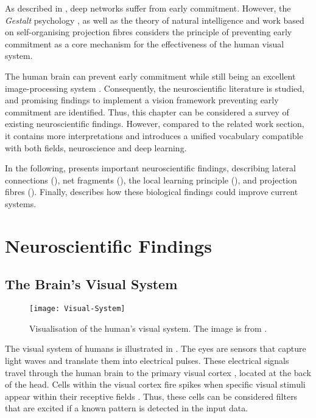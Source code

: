 As described in , deep networks suffer from early commitment.
However, the \emph{Gestalt} psychology \cite{ellis_source_1938, kohler_gestalt_1992, wagemans_century_2012, hamlyn_psychology_2017}, as well as the theory of natural intelligence \cite{von_der_malsburg_theory_2022} and work based on self-organising projection fibres \cite{bienenstock_neural_1987, lades_distortion_1993, wiskott_face_1996, fernandes_self-organization_2015} considers the principle of preventing early commitment as a core mechanism for the effectiveness of the human visual system.

The human brain can prevent early commitment \cite{marr_vision_2010} while still being an excellent image-processing system \cite{ellis_source_1938, kohler_gestalt_1992, wagemans_century_2012, hamlyn_psychology_2017}. 
Consequently, the neuroscientific literature is studied, and promising findings to implement a vision framework preventing early commitment are identified.
Thus, this chapter can be considered a survey of existing neuroscientific findings.
However, compared to the related work section, it contains more interpretations and introduces a unified vocabulary compatible with both fields, neuroscience and deep learning.

In the following,  presents important neuroscientific findings, describing lateral connections (), net fragments (), the local learning principle (), and projection fibres ().
Finally,  describes how these biological findings could improve current systems.



\section{Neuroscientific Findings}

\subsection{The Brain's Visual System}
\begin{figure}[h]
    \centering
    \texttt{[image: Visual-System]}
    \caption[Visualisation of the human's visual system]{Visualisation of the human's visual system. The image is from .}
\end{figure}
%
The visual system of humans is illustrated in . The eyes are sensors that capture light waves and translate them into electrical pulses. These electrical signals travel through the human brain to the primary visual cortex , located at the back of the head.
Cells within the visual cortex fire spikes when specific visual stimuli appear within their receptive fields \cite{grill-spector_human_2004}. Thus, these cells can be considered filters that are excited if a known pattern is detected in the input data. 


